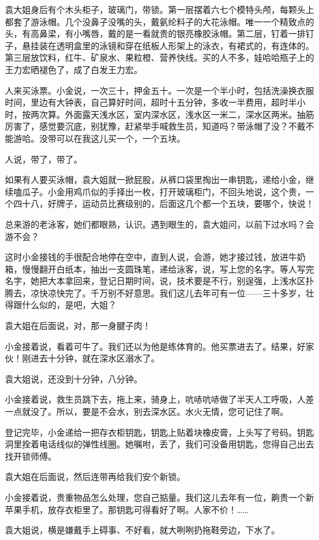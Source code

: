 \documentclass[lang=cn,newtx,12pt,scheme=chinese]{elegantbook}
\begin{document}
袁大姐身后有个木头柜子，玻璃门，带锁。第一层摆着六七个模特头颅，每颗头上都套了游泳帽。几个没鼻子没嘴的头，戴氨纶料子的大花泳帽。唯一一个精致点的头，有高鼻梁，有小嘴唇，戴的是一看就贵的银亮橡胶泳帽。第二层，钉着一排钉子，悬挂装在透明盒里的泳镜和穿在纸板人形架上的泳衣，有裙式的，有连体的。第三层放饮料，红牛、矿泉水、果粒橙、营养快线。买的人不多，娃哈哈瓶子上的王力宏晒褪色了，成了白发王力宏。

人来买泳票。小金说，一次三十，押金五十。一次是一个半小时，包括洗澡换衣服时间，里边有大钟表，自己算好时间，超时十五分钟，多收一半费用，超时半小时，按两次算。外面露天浅水区，室内深水区，浅水区一米二，深水区两米。抽筋厉害了，感觉要沉底，别犹豫，赶紧举手喊救生员，知道吗？带泳帽了没？不戴不能游哈。没带可以在我这儿买一个，一个五块。

人说，带了，带了。

如果有人要买泳帽，袁大姐就一掀屁股，从裤口袋里掏出一串钥匙，递给小金，继续嗑瓜子。小金用鸡爪似的手择出一枚，打开玻璃柜门，不回头地说，这个贵，一个四十八，好牌子，运动员比赛级别的，后面这几个都一个五块，要哪个，快说！

总来游的老泳客，她们都眼熟，认识。遇到眼生的，袁大姐问，以前下过水吗？会游不会？

这时小金接钱的手很配合地停在空中，直到人说，会游，她才接过钱，放进牛奶箱，慢慢翻开白纸本，抽出一支圆珠笔，递给泳客，说，写上您的名字。等人写完名字，她把大本拿回来，登记日期时间，说，技术要是不行，别逞强，上浅水区扑腾去，凉快凉快完了。千万别不好意思。我们这儿去年可有一位——三十多岁，壮得跟什么似的，是吧，大姐？

袁大姐在后面说，对，那一身腱子肉！

小金接着说，看着可牛了。我们还以为他是练体育的。他买票进去了。结果，好家伙！刚进去十分钟，就在深水区溺水了。

袁大姐说，还没到十分钟，八分钟。

小金接着说，救生员跳下去，拖上来，骑身上，吭哧吭哧做了半天人工呼吸，人差一点就没了。所以，要是不会水，别去深水区。水火无情，您可记住了啊。

登记完毕，小金递给一把存衣柜钥匙，钥匙上贴着块橡皮膏，上头写了号码。钥匙洞里拴着电话线似的弹性线圈。她嘱咐，丢了，我们可没备用钥匙，您得自己出去找开锁师傅。

袁大姐在后面说，然后连带再给我们安个新锁。

小金接着说，贵重物品怎么处理，您自己掂量。我们这儿去年有一位，齁贵一个新苹果手机，放存衣柜里了。那钥匙可得看好了啊。人家不价！……

袁大姐说，横是嫌戴手上碍事、不好看，就大咧咧扔拖鞋旁边，下水了。
\end{document}
